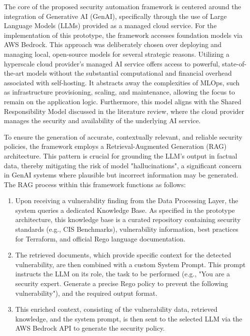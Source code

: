 The core of the proposed security automation framework is centered around the integration of Generative AI (GenAI), specifically through the use of Large Language Models (LLMs) provided as a managed cloud service. For the implementation of this prototype, the framework accesses foundation models via AWS Bedrock. This approach was deliberately chosen over deploying and managing local, open-source models for several strategic reasons. Utilizing a hyperscale cloud provider's managed AI service offers access to powerful, state-of-the-art models without the substantial computational and financial overhead associated with self-hosting. It abstracts away the complexities of MLOps, such as infrastructure provisioning, scaling, and maintenance, allowing the focus to remain on the application logic. Furthermore, this model aligns with the Shared Responsibility Model discussed in the literature review, where the cloud provider manages the security and availability of the underlying AI service.

To ensure the generation of accurate, contextually relevant, and reliable security policies, the framework employs a Retrieval-Augmented Generation (RAG) architecture. This pattern is crucial for grounding the LLM's output in factual data, thereby mitigating the risk of model "hallucinations", a significant concern in GenAI systems where plausible but incorrect information may be generated. The RAG process within this framework functions as follows:
\begin{enumerate}
    \item Upon receiving a vulnerability finding from the Data Processing Layer, the system queries a dedicated Knowledge Base. As specified in the prototype architecture, this knowledge base is a curated repository containing security standards (e.g., CIS Benchmarks), vulnerability information, best practices for Terraform, and official Rego language documentation.
    \item The retrieved documents, which provide specific context for the detected vulnerability, are then combined with a custom System Prompt. This prompt instructs the LLM on its role, the task to be performed (e.g., "You are a security expert. Generate a precise Rego policy to prevent the following vulnerability"), and the required output format.
    \item This enriched context, consisting of the vulnerability data, retrieved knowledge, and the system prompt, is then sent to the selected LLM via the AWS Bedrock API to generate the security policy.
\end{enumerate}

